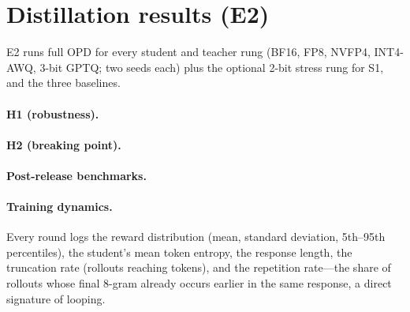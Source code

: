 \section{Distillation results (E2)}\label{sec:distillation}

E2 runs full OPD for every student and teacher rung (BF16, FP8, NVFP4, INT4-AWQ, 3-bit GPTQ;
two seeds each) plus the optional 2-bit stress rung for S1, and the three baselines.




\paragraph{H1 (robustness).} \TBD{} 

\paragraph{H2 (breaking point).} \TBD{} 

\paragraph{Post-release benchmarks.} \TBD{} 

\paragraph{Training dynamics.} Every round logs the reward distribution (mean, standard
deviation, 5th--95th percentiles), the student's mean token entropy, the response length, the
truncation rate (rollouts reaching \rolloutMaxTok{} tokens), and the repetition rate---the share
of rollouts whose final 8-gram already occurs earlier in the same response, a direct signature of
looping. \TBD{} 
